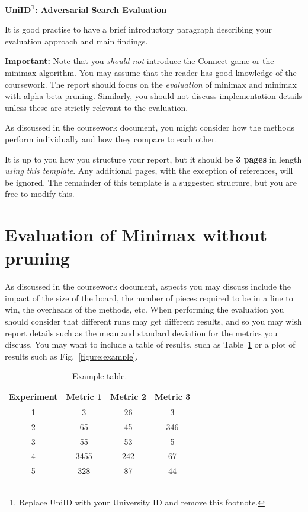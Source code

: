 \documentclass[11pt]{article}
\begin{document}
\centerline{\bf \Large UniID\footnote{Replace UniID with your University ID and remove this footnote.}: Adversarial Search Evaluation}
\bigskip

It is good practise to have a brief introductory paragraph describing your evaluation approach and main findings.

{\bf Important:} Note that you {\em should not} introduce the Connect game or the minimax algorithm. You may assume that the reader has good knowledge of the coursework. The report should focus on the {\em evaluation} of minimax and minimax with alpha-beta pruning. Similarly, you should not discuss implementation details unless these are strictly relevant to the evaluation.

As discussed in the coursework document, you might consider how the methods perform individually and how they compare to each other.

It is up to you how you structure your report, but it should be {\bf 3 pages} in length {\em using this template}. Any additional pages, with the exception of references, will be ignored. The remainder of this template is a suggested structure, but you are free to modify this.

\section{Evaluation of Minimax without pruning}

As discussed in the coursework document, aspects you may discuss include the impact of the size of the board, the number of pieces required to be in a line to win, the overheads of the methods, etc. When performing the evaluation you should consider that different runs may get different results, and so you may wish report details such as the mean and standard deviation for the metrics you discuss. You may want to include a table of results, such as Table~\ref{table:1} or a plot of results such as Fig.~\ref{figure:example}.

\begin{table}[h!]
\centering
\begin{tabular}{c | c c c} 
 Experiment & Metric 1 & Metric 2 & Metric 3 \\ 
 \hline
 1 & 3 & 26 & 3 \\ 
 2 & 65 & 45 & 346 \\
 3 & 55 & 53 & 5 \\
 4 & 3455 & 242 & 67 \\
 5 & 328 & 87 & 44 
\end{tabular}
\caption{Example table.}
\label{table:1}
\end{table}
\end{document}
